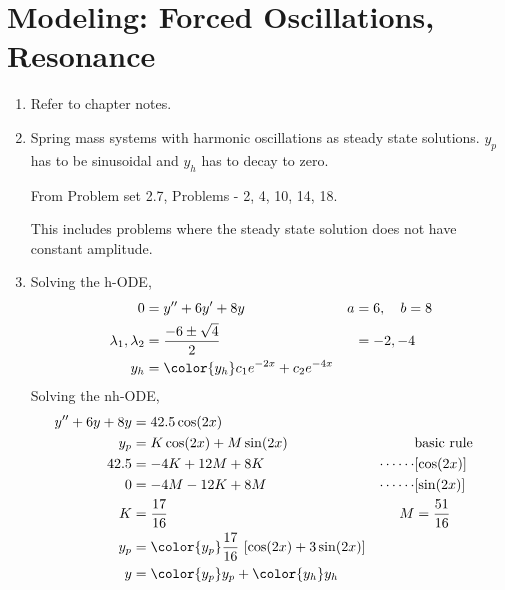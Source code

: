 \section{Modeling: Forced Oscillations, Resonance}

\begin{enumerate}
    \item Refer to chapter notes.

    \item Spring mass systems with harmonic oscillations as steady state solutions.
          $ y_{p} $ has to be sinusoidal and $ y_{h} $ has to decay to zero. \par
          From Problem set 2.7, Problems - 2, 4, 10, 14, 18. \par
          This includes problems where the steady state solution does not have constant
          amplitude.

    \item Solving the h-ODE,
          \begin{align}
              0                        & = y'' + 6y' + 8y                          & a & = 6, \quad b = 8 \\
              \lambda_{1}, \lambda_{2} & = \frac{-6 \pm \sqrt{4}}{2}               &   & = -2, -4         \\
              y_{h}                    & = \color{y_h} c_{1}e^{-2x} + c_{2}e^{-4x}
          \end{align}
          Solving the nh-ODE,
          \begin{align}
              y'' + 6y + 8y & = 42.5\cos(2x)                                                                         \\
              y_{p}         & = K \cos(2x) + M \sin(2x)                           &              & \text{basic rule} \\
              42.5          & = -4K + 12M + 8K                                    & \cdots\cdots & [\cos(2x)]        \\
              0             & = -4M - 12K + 8M                                    & \cdots\cdots & [\sin(2x)]        \\
              K             & = \frac{17}{16}                                     & M            & = \frac{51}{16}   \\
              y_{p}         & = \color{y_p} \frac{17}{16}\ [\cos(2x) + 3\sin(2x)]                                    \\
              y             & = {\color{y_p} y_{p}} + {\color{y_h} y_{h}}
          \end{align}


\end{enumerate}
